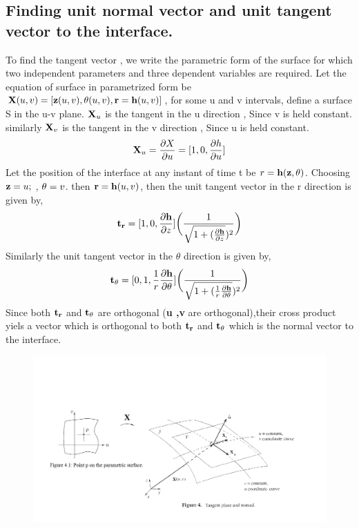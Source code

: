 \documentclass{article}
\begin{document}
\subsection{Finding unit normal vector and unit tangent vector to the interface.}
To find the tangent vector , we write the parametric form of the surface for which two independent parameters and three dependent variables are required.\newline
Let the equation of surface in parametrized form be  ${\bf X}(u,v) = [{\bf z}(u,v), {\bf \theta }(u,v), {\bf r = h}(u,v)]$, for some u and v intervals, define a surface S in the u-v plane. ${\bf X}_{u}$ is the tangent in the u direction , Since v is held constant.
similarly ${\bf X}_{v}$ is the tangent in the v direction , Since u is held constant.\newline
\begin{equation*}
{\bf X}_{u} = \frac{\partial X}{\partial u} = [{1 , 0 , \frac{\partial h}{\partial u}}]
\end{equation*}
\newline
Let the position of the interface at any instant of time t be $ r = {\bf h( z,\theta )}$.\newline
Choosing $ {\bf z} = u;$ ,  ${\bf \theta } = v $. then  $ {\bf r} = {\bf h}(u,v)$, then the unit tangent vector in the r direction is given by,
\begin{equation}
{\bf t_{r}} = [{1 , 0 , \frac{\partial {\bf h}}{\partial z}}]\bigg(\frac{1}{\sqrt{1 + (\frac{\partial {\bf h}}{\partial z}})^2}\bigg)
\end{equation}
Similarly the unit tangent vector in the $\theta $ direction is given by,
\begin{equation}
{\bf t_{\theta }} = [{0 , 1 , \frac{1}{r}\frac{\partial {\bf h}}{\partial \theta }}]\bigg(\frac{1}{\sqrt{1 + (\frac{1}{r}\frac{\partial {\bf h}}{\partial \theta }})^2}\bigg)
\end{equation}
Since both $ {\bf t_{r}}$ and ${\bf t_{\theta }}$ are orthogonal ({\bf u ,v} are orthogonal),their cross product yiels a vector which is orthogonal to both  $ {\bf t_{r}}$ and ${\bf t_{\theta }}$ which is the normal vector to the interface.

\begin{figure}[H] 
  \includegraphics[width=6.0in]{tangentplane.png}
\end{figure}
\end{document}
